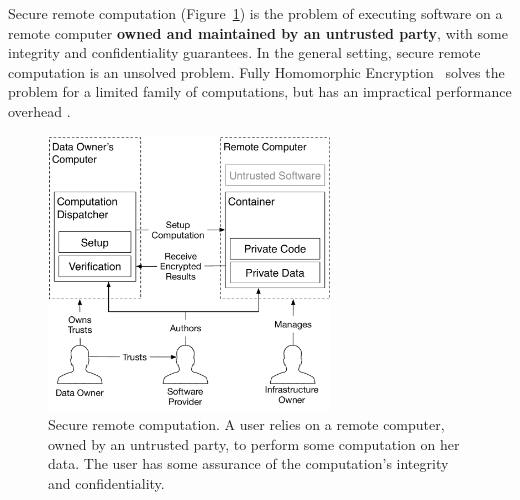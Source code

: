 Secure remote computation (Figure~\ref{fig:remote_computation}) is the problem
of executing software on a remote computer \textbf{owned and maintained by an
untrusted party}, with some integrity and confidentiality guarantees. In the
general setting, secure remote computation is an unsolved problem. Fully
Homomorphic Encryption~\cite{gentry2009fhe} solves the problem for a limited
family of computations, but has an impractical performance overhead
\cite{naehrig2011can}.

\begin{figure}[hbt]
  \centering
  \includegraphics[width=75mm]{figures/remote_computation.pdf}
  \caption{
    Secure remote computation. A user relies on a remote computer, owned by an
    untrusted party, to perform some computation on her data. The user has some
    assurance of the computation's integrity and confidentiality.
  }
  \label{fig:remote_computation}
\end{figure}

